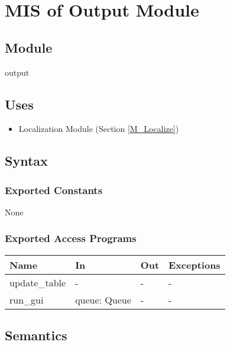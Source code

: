 \documentclass[12pt, titlepage]{article}
\begin{document}

\newpage

\section{MIS of Output Module} \label{M_Output} 
\subsection{Module}

output

\subsection{Uses}
\begin{itemize}
  \item Localization Module (Section \ref{M_Localize})
\end{itemize}

\subsection{Syntax}

\subsubsection{Exported Constants}
None

\subsubsection{Exported Access Programs}

\begin{center}
\begin{tabular}{p{4cm} p{4cm} p{4cm} p{2cm}}
\hline
\textbf{Name} & \textbf{In} & \textbf{Out} & \textbf{Exceptions} \\
\hline
update\_table & - & - & - \\
run\_gui & queue: Queue & - & - \\
\hline
\end{tabular}
\end{center}

\subsection{Semantics}
\end{document}
